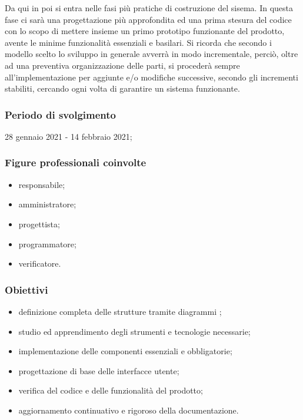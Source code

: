 Da qui in poi si entra nelle fasi più pratiche di costruzione del sisema. In questa fase ci sarà una progettazione più approfondita ed una prima stesura del codice con lo scopo di mettere insieme un primo prototipo funzionante del prodotto, avente le minime funzionalità essenziali e basilari. Si ricorda che secondo i modello scelto lo sviluppo in generale avverrà in modo incrementale, perciò, oltre ad una preventiva organizzazione delle parti, si procederà sempre all'implementazione per aggiunte e/o modifiche successive, secondo gli incrementi stabiliti, cercando ogni volta di garantire un sistema funzionante.
        
        \subsubsection{Periodo di svolgimento}
        28 gennaio 2021 - 14 febbraio 2021;
        
        \subsubsection{Figure professionali coinvolte}
            \begin{itemize}
                \item responsabile;
                \item amministratore;
                \item progettista;
                \item programmatore;
                \item verificatore.
            \end{itemize}

        \subsubsection{Obiettivi}    
        \begin{itemize}
            \item definizione completa delle strutture tramite diagrammi ;
            \item studio ed apprendimento degli strumenti e tecnologie necessarie;
            \item implementazione delle componenti essenziali e obbligatorie;
            \item progettazione di base delle interfacce utente;
            \item verifica del codice e delle funzionalità del prodotto;
            \item aggiornamento continuativo e rigoroso della documentazione.
        \end{itemize}